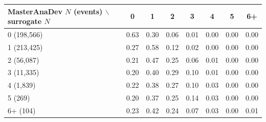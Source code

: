 \begin{tabular}{lccccccc}
\toprule
MasterAnaDev $N$ (events) $\backslash$ surrogate $N$ & 0 & 1 & 2 & 3 & 4 & 5 & 6+ \\
\midrule
0 (198,566) & 0.63 & 0.30 & 0.06 & 0.01 & 0.00 & 0.00 & 0.00 \\
1 (213,425) & 0.27 & 0.58 & 0.12 & 0.02 & 0.00 & 0.00 & 0.00 \\
2 (56,087) & 0.21 & 0.47 & 0.25 & 0.06 & 0.01 & 0.00 & 0.00 \\
3 (11,335) & 0.20 & 0.40 & 0.29 & 0.10 & 0.01 & 0.00 & 0.00 \\
4 (1,839) & 0.22 & 0.38 & 0.27 & 0.10 & 0.03 & 0.00 & 0.00 \\
5 (269) & 0.20 & 0.37 & 0.25 & 0.14 & 0.03 & 0.00 & 0.00 \\
6+ (104) & 0.23 & 0.42 & 0.24 & 0.07 & 0.03 & 0.00 & 0.01 \\
\bottomrule
\end{tabular}

